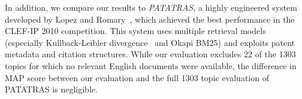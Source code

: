 In addition, we compare our results to \textit{PATATRAS}, a highly engineered system developed by Lopez and Romary~\cite{lopez2010patatras}, which achieved the best performance in the CLEF-IP 2010 competition. This system uses multiple retrieval models (especially Kullback-Leibler divergence~\cite{Baeza-Yates2011} and Okapi BM25) and exploits patent metadata and citation structures.  While our evaluation excludes 22 of the 1303 topics for which no relevant English documents were available, the difference in MAP score between our evaluation and the full 1303 topic evaluation of PATATRAS is negligible.
% 

